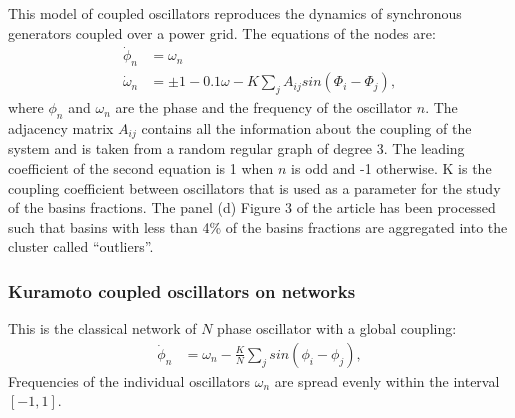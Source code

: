 \documentclass[%
 aip,
 amsmath,amssymb,
 reprint,%
]{revtex4-1}
\begin{document}
This model of coupled oscillators reproduces the dynamics of synchronous generators coupled over a power grid. The equations of the nodes are: 
\begin{align*}
\dot \phi_n &=  \omega_n\\
\dot \omega_n &= \pm 1 - 0.1\omega - K \sum_j A_{ij}sin(\Phi_i - \Phi_j),
\end{align*}
where $\phi_n$ and $\omega_n$ are the phase and the frequency of the oscillator $n$. The adjacency matrix $A_{ij}$ contains all the information about the coupling of the system and is taken from a random regular graph of degree 3. The leading coefficient of the second equation is 1 when $n$ is odd and -1 otherwise. K is the coupling coefficient between oscillators that is used as a parameter for the study of the basins fractions. The panel (d) Figure 3 of the article has been processed such that basins with less than 4\% of the basins fractions are aggregated into the cluster called ``outliers''. 

\subsubsection*{Kuramoto coupled oscillators on networks}
This is the classical network of $N$ phase oscillator with a global coupling: 
\begin{align*}
\dot \phi_n &= \omega_n - \frac{K}{N} \sum_j sin(\phi_i - \phi_j),
\end{align*}
Frequencies of the individual oscillators $\omega_n$ are spread evenly within the interval $[-1, 1]$. 



\end{document}
